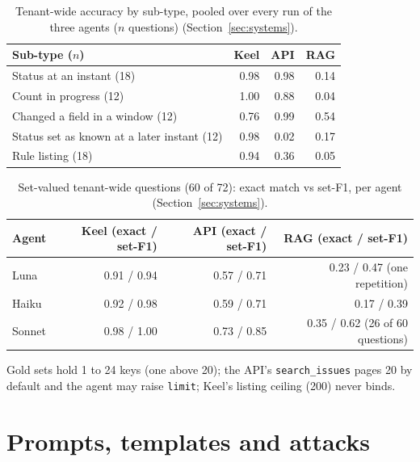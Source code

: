 \documentclass{article}
\newcommand{\code}[1]{\texttt{#1}}
\begin{document}
\begin{table}[htbp]
\caption{Tenant-wide accuracy by sub-type, pooled over every run of the three agents ($n$ questions) (Section~\ref{sec:systems}).}
\label{tab:b5}
\centering
\small
\begin{tabular}{l r r r}
\toprule
Sub-type ($n$) & Keel & API & RAG \\
\midrule
Status at an instant (18) & 0.98 & 0.98 & 0.14 \\
Count in progress (12) & 1.00 & 0.88 & 0.04 \\
Changed a field in a window (12) & 0.76 & 0.99 & 0.54 \\
Status set as known at a later instant (12) & 0.98 & 0.02 & 0.17 \\
Rule listing (18) & 0.94 & 0.36 & 0.05 \\
\bottomrule
\end{tabular}
\end{table}

\begin{table}[htbp]
\caption{Set-valued tenant-wide questions (60 of 72): exact match vs set-F1, per agent (Section~\ref{sec:systems}).}
\label{tab:b6}
\centering
\small
\begin{tabular}{l r r r}
\toprule
Agent & Keel (exact / set-F1) & API (exact / set-F1) & RAG (exact / set-F1) \\
\midrule
Luna & 0.91 / 0.94 & 0.57 / 0.71 & 0.23 / 0.47 (one repetition) \\
Haiku & 0.92 / 0.98 & 0.59 / 0.71 & 0.17 / 0.39 \\
Sonnet & 0.98 / 1.00 & 0.73 / 0.85 & 0.35 / 0.62 (26 of 60 questions) \\
\bottomrule
\end{tabular}
\par\vspace{5pt}
\begin{minipage}{\textwidth}
\footnotesize
Gold sets hold 1 to 24 keys (one above 20); the API's \code{search\_issues} pages 20 by default and the agent may raise \code{limit}; Keel's listing ceiling (200) never binds.
\end{minipage}
\end{table}

\clearpage
\section{Prompts, templates and attacks}
\label{app:prompts}
\end{document}
